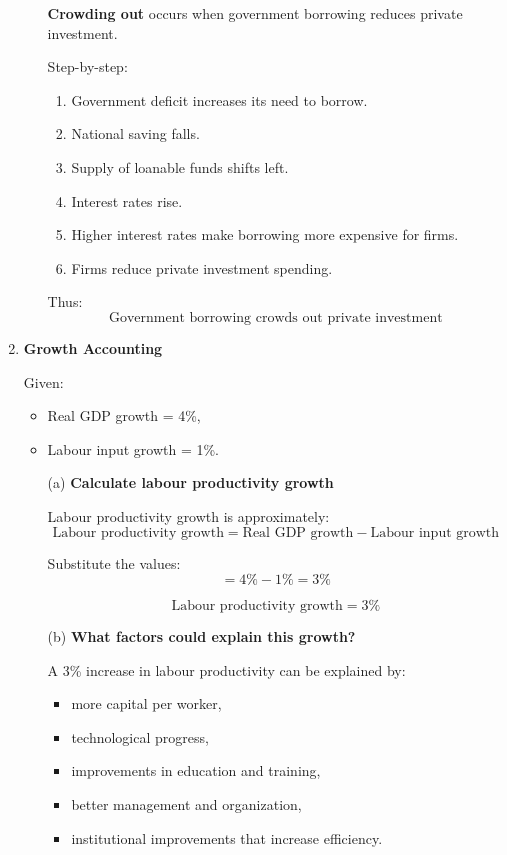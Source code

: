 \documentclass[12pt]{article}
\begin{document}
\begin{enumerate}[label=\textbf{\arabic*.}, start=4]
\begin{enumerate}
\textbf{Crowding out} occurs when government borrowing reduces private investment.

Step-by-step:
\begin{enumerate}
    \item Government deficit increases its need to borrow.
    \item National saving falls.
    \item Supply of loanable funds shifts left.
    \item Interest rates rise.
    \item Higher interest rates make borrowing more expensive for firms.
    \item Firms reduce private investment spending.
\end{enumerate}

Thus:
\[
\boxed{\text{Government borrowing crowds out private investment}}
\]
\end{enumerate}



\item \textbf{Growth Accounting}

Given:
\begin{itemize}
    \item Real GDP growth = 4\%,
    \item Labour input growth = 1\%.
\end{itemize}

\begin{enumerate}
    \item[(a)] \textbf{Calculate labour productivity growth}

Labour productivity growth is approximately:
\[
\text{Labour productivity growth} = \text{Real GDP growth} - \text{Labour input growth}
\]

Substitute the values:
\[
= 4\% - 1\% = 3\%
\]

\[
\boxed{\text{Labour productivity growth} = 3\%}
\]

\item[(b)] \textbf{What factors could explain this growth?}

A 3\% increase in labour productivity can be explained by:
\begin{itemize}
    \item more capital per worker,
    \item technological progress,
    \item improvements in education and training,
    \item better management and organization,
    \item institutional improvements that increase efficiency.
\end{itemize}
\end{enumerate}

\end{enumerate}
\end{document}
